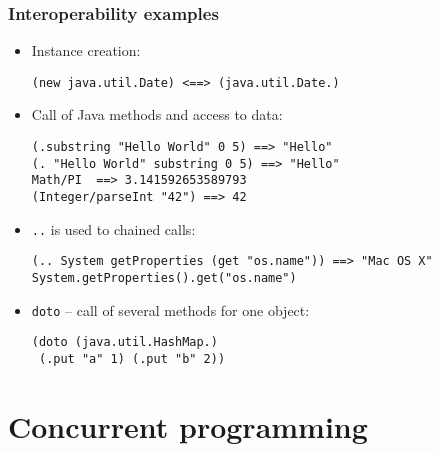 \begin{frame}[fragile]
  \frametitle{Interoperability examples}
  \begin{itemize}
  \item Instance creation:
\begin{lstlisting}
(new java.util.Date) <==> (java.util.Date.)
\end{lstlisting}
  \item Call of Java methods and access to data:
\begin{lstlisting}
(.substring "Hello World" 0 5) ==> "Hello"
(. "Hello World" substring 0 5) ==> "Hello"
Math/PI  ==> 3.141592653589793
(Integer/parseInt "42") ==> 42
\end{lstlisting}
  \item \texttt{..} is used to chained calls:
\begin{lstlisting}
(.. System getProperties (get "os.name")) ==> "Mac OS X"
System.getProperties().get("os.name")
\end{lstlisting}
  \item \texttt{doto} -- call of several methods for one object:
\begin{lstlisting}
(doto (java.util.HashMap.)
 (.put "a" 1) (.put "b" 2))
\end{lstlisting}
  \end{itemize}
\end{frame}


\section{Concurrent programming}

